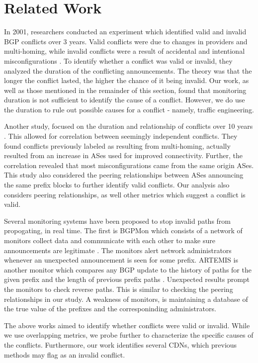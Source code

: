  \section{Related Work}\label{sec:relatedwork}

In 2001, researchers conducted an experiment which identified valid and invalid BGP conflicts over 3 years. Valid conflicts were due to changes in providers and multi-homing, while invalid conflicts were a result of accidental and intentional misconfigurations \cite{colorado}. To identify whether a conflict was valid or invalid, they analyzed the duration of the conflicting announcements. The theory was that the longer the conflict lasted, the higher the chance of it being invalid. Our work, as well as those mentioned in the remainder of this section, found that monitoring duration is not sufficient to identify the cause of a conflict. However, we do use the duration to rule out possible causes for a conflict - namely, traffic engineering.

Another study, focused on the duration and relationship of conflicts over 10 years \cite{euro}. This allowed for correlation between seemingly independent conflicts. They found conflicts previously labeled as resulting from multi-homing, actually resulted from an increase in ASes used for improved connectivity. Further, the correlation revealed that most misconfigurations came from the same origin ASes. This study also considered the peering relationships between ASes announcing the same prefix blocks to further identify valid conflicts. Our analysis also considers peering relationships, as well other metrics which suggest a conflict is valid.

Several monitoring systems have been proposed to stop invalid paths from propogating, in real time. The first is BGPMon which consists of a network of monitors collect data and communicate with each other to make sure announcements are legitimate \cite{bgpmon}. The monitors alert network administrators whenever an unexpected announcement is seen for some prefix. ARTEMIS is another monitor which compares any BGP update to the history of paths for the given prefix and the length of previous prefix paths \cite{artemis}. Unexpected results prompt the monitors to check reverse paths. This is similar to checking the peering relationships in our study. A weakness of monitors, is maintaining a database of the true value of the prefixes and the corresponinding administrators.

The above works aimed to identify whether conflicts were valid or invalid. While we use overlapping metrics, we probe further to characterize the specific causes of the conflicts. Furthermore, our work identifies several CDNs, which previous methods may flag as an invalid conflict.
